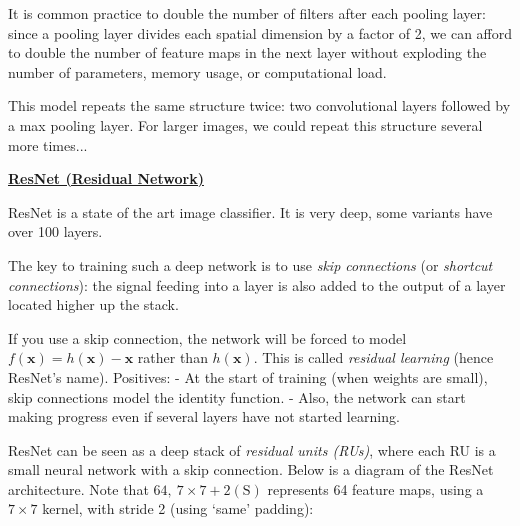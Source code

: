 
It is common practice to double the number of filters after each pooling layer:
since a pooling layer divides each spatial dimension by a factor of 2,
we can afford to double the number of feature maps in the next layer
without exploding the number of parameters, memory usage, or computational load.

This model repeats the same structure twice:
two convolutional layers followed by a max pooling layer.
For larger images, we could repeat this structure several more times...

\newpage
\textbf{\underline{ResNet (Residual Network)}}

ResNet is a state of the art image classifier.
It is very deep, some variants have over 100 layers.

The key to training such a deep network is to use \textit{skip connections} (or \textit{shortcut connections}):\newline
the signal feeding into a layer is also added to the output of a layer located higher up the stack.

If you use a skip connection,
the network will be forced to model $f(\boldsymbol{x}) = h(\boldsymbol{x}) - \boldsymbol{x}$
\newline rather than $h(\boldsymbol{x})$.
This is called \textit{residual learning} (hence ResNet's name). Positives:\newline
- At the start of training (when weights are small), skip connections model the identity function.\newline
- Also, the network can start making progress even if several layers have not started learning.

ResNet can be seen as a deep stack of \textit{residual units (RUs)},
where each RU is a small neural network with a skip connection.
Below is a diagram of the ResNet architecture.
Note that $64,~7\!\times\!7 + 2(\textrm{S})$ represents 64 feature maps,
using a $7\!\times\!7$ kernel, with stride 2 (using `same' padding):

